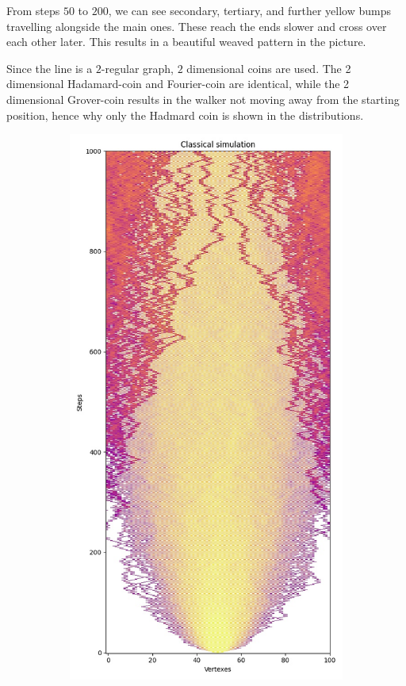 From steps $50$ to $200$, we can see secondary, tertiary, and further yellow bumps travelling alongside the main ones. These reach the ends slower and cross over each other later. This results in a beautiful weaved pattern in the picture.

Since the line is a $2$-regular graph, $2$ dimensional coins are used. The 2 dimensional Hadamard-coin and Fourier-coin are identical, while the 2 dimensional Grover-coin results in the walker not moving away from the
starting position, hence why only the Hadmard coin is shown in the distributions.

\begin{figure}[H]
  \centering
  \begin{subfigure}{.45\linewidth}
    \centering
    \includegraphics[width=\linewidth]{./figures/results/path/classical.jpg}

\end{subfigure}
\end{figure}
